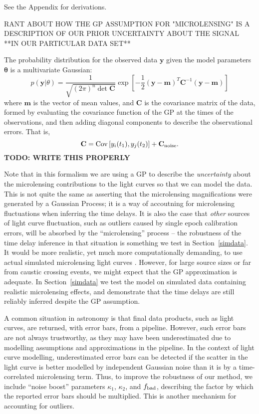 \documentclass[useAMS,usenatbib, a4paper]{mn2e} \usepackage{natbib}
\begin{document}
See the Appendix for derivations.


{RANT ABOUT HOW THE GP ASSUMPTION FOR "MICROLENSING" IS A DESCRIPTION OF OUR
PRIOR UNCERTAINTY ABOUT THE SIGNAL **IN OUR PARTICULAR DATA SET**}

The probability distribution for the observed data $\mathbf{y}$ given the
model parameters $\boldsymbol{\theta}$ is a multivariate Gaussian:
\begin{equation}
p(\mathbf{y} | \theta) = \frac{1}{\sqrt{(2\pi)^n \det \mathbf{C}}}
\exp\left[-\frac{1}{2}
(\mathbf{y} - \mathbf{m})^T\mathbf{C}^{-1}(\mathbf{y} - \mathbf{m})\right]
\end{equation}
where $\mathbf{m}$ is the vector of mean values, and $\mathbf{C}$ is the
covariance matrix of the data, formed by evaluating the covariance function of
the GP at the times of the observations, and then adding diagonal components
to describe the observational errors. That is,
\begin{equation}
\mathbf{C} = \textnormal{Cov}\left[y_i(t_1), y_j(t_2)\right] + \mathbf{C}_{\rm noise}.
\end{equation}
{\bf TODO: WRITE THIS PROPERLY}

Note that in this formalism we are using a  GP to describe the {\it
uncertainty} about the microlensing contributions to the light curves so that
we can model the data. This is not quite the same as asserting that the
microlensing magnifications were generated by a Gaussian Process; it is a way
of accoutning for microlensing fluctuations when inferring the time delays. It
is also the case that {\it other} sources of light curve fluctuation, such as
outliers caused by single epoch calibration errors, will be absorbed by the
``microlensing'' process -- the robustness of the time delay inference in that
situation is something we test in Section~\ref{simdata}. It would be more
realistic, yet much more computationally demanding, to use actual simulated
microlensing  light curves \citep{1999JCoAM.109..353W, 2008ApJ...676...80M,
2010NewA...15..181G}. However, for large source sizes or far from caustic
crossing events, we might expect that the GP approximation is adequate. In
Section~\ref{simdata} we test the model on simulated data containing realistic
microlensing effects, and demonstrate that the time delays are still reliably
inferred despite the GP assumption.

A common situation in astronomy is that final data products, such as light
curves, are returned, with error bars, from a pipeline. However, such error
bars are not always trustworthy, as they may have been underestimated due to
modelling assumptions and approximations in the pipeline. In the context of
light curve modelling, underestimated error bars can be detected if the
scatter in the light curve is better modelled by independent Gaussian noise
than it is by a time-correlated microlensing term. Thus, to improve the
robustness of our method, we include ``noise boost'' parameters $\kappa_1$,
$\kappa_2$, and $f_{\rm bad}$,
describing the factor by which the reported error bars should be multiplied.
This is another mechanism for accounting for outliers.
\end{document}
